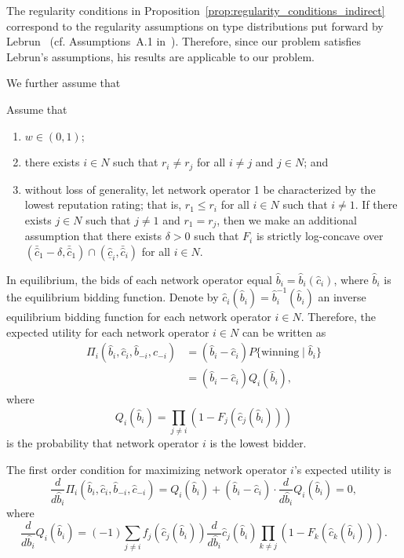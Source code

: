 The regularity conditions in Proposition~\ref{prop:regularity_conditions_indirect} correspond to the regularity assumptions on type distributions put forward by Lebrun~\cite{Lebrun2006} (cf. Assumptions~A.1 in~\cite{Lebrun2006}). Therefore, since our problem satisfies Lebrun's assumptions, his results are applicable to our problem.

We further assume that
\begin{assumptions}
\label{ass:assumptions_generic_indirect}
Assume that
\begin{enumerate}
  \item $w\in(0,1)$;
  \item there exists $i\in N$ such that $r_i\neq r_j$ for all $i\neq j$ and $j\in N$; and
  \item without loss of generality, let network operator 1 be characterized by the lowest reputation rating; that is, $r_1 \leq r_i$ for all $i\in N$ such that $i\neq 1$. If there exists $j\in N$ such that $j\neq 1$ and $r_1 = r_j$, then we make an additional assumption that there exists $\delta > 0$ such that $F_i$ is strictly log-concave over $(\bar{\hat{c}}_1 - \delta, \bar{\hat{c}}_1)\cap (\underline{\hat{c}}_i, \bar{\hat{c}}_i)$ for all $i\in N$.
\end{enumerate}
\end{assumptions}

In equilibrium, the bids of each network operator equal $\hat{b}_i = \hat{b}_i(\hat{c}_i)$, where $\hat{b}_i$ is the equilibrium bidding function. Denote by $\hat{c}_i(\hat{b}_i)= \hat{b}_i^{-1}(\hat{b}_i)$ an inverse equilibrium bidding function for each network operator $i\in N$. Therefore, the expected utility for each network operator $i\in N$ can be written as
\begin{align}
  \label{eq:def_expected_utility_indirect}
  \Pi_i(\hat{b}_i,\hat{c}_i,\hat{b}_{-i},\hat{c}_{-i})
  &= (\hat{b}_i - \hat{c}_i)P\{\textrm{winning}\mid\hat{b}_i\}\\ \nonumber
  &= (\hat{b}_i - \hat{c}_i)Q_i(\hat{b}_i),
\end{align}
where
\begin{equation*}
Q_i(\hat{b}_i) = \prod_{j\neq i}\left( 1 - F_j(\hat{c}_j(\hat{b}_i)) \right)
\end{equation*}
is the probability that network operator $i$ is the lowest bidder.

The first order condition for maximizing network operator $i$'s expected utility is
\begin{equation}
  \label{eq:foc_indirect}
  \frac{d}{d\hat{b}_i}\Pi_i(\hat{b}_i,\hat{c}_i,\hat{b}_{-i},\hat{c}_{-i}) = Q_i(\hat{b}_i) + (\hat{b}_i - \hat{c}_i)\cdot\frac{d}{d\hat{b}_i}Q_i(\hat{b}_i) = 0,
\end{equation}
where
\begin{equation*}
  \frac{d}{d\hat{b}_i}Q_i(\hat{b}_i) = (-1)\sum_{j\neq i} f_j(\hat{c}_j(\hat{b}_i))\frac{d}{d\hat{b}_i}\hat{c}_j(\hat{b}_i)\prod_{k\neq j} \left( 1 - F_k(\hat{c}_k(\hat{b}_i)) \right).
\end{equation*}

